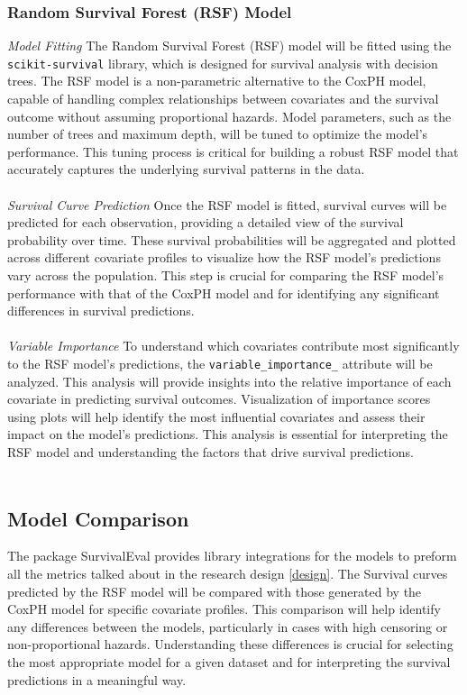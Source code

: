 \subsubsection*{Random Survival Forest (RSF) Model}
\noindent \textit{Model Fitting} The Random Survival Forest (RSF) model will be fitted using the \texttt{scikit-survival} library, which is designed for survival analysis with decision trees. The RSF model is a non-parametric alternative to the CoxPH model, capable of handling complex relationships between covariates and the survival outcome without assuming proportional hazards. Model parameters, such as the number of trees and maximum depth, will be tuned to optimize the model's performance. This tuning process is critical for building a robust RSF model that accurately captures the underlying survival patterns in the data.
\\\\
\noindent \textit{Survival Curve Prediction} Once the RSF model is fitted, survival curves will be predicted for each observation, providing a detailed view of the survival probability over time. These survival probabilities will be aggregated and plotted across different covariate profiles to visualize how the RSF model's predictions vary across the population. This step is crucial for comparing the RSF model's performance with that of the CoxPH model and for identifying any significant differences in survival predictions.
\\\\
\noindent \textit{Variable Importance} To understand which covariates contribute most significantly to the RSF model's predictions, the \texttt{variable\_importance\_} attribute will be analyzed. This analysis will provide insights into the relative importance of each covariate in predicting survival outcomes. Visualization of importance scores using plots will help identify the most influential covariates and assess their impact on the model's predictions. This analysis is essential for interpreting the RSF model and understanding the factors that drive survival predictions.
\\\\

\subsection*{Model Comparison}
The package SurvivalEval \parencite{qi_survivaleval_2024} provides library integrations for the models to preform all the metrics talked about in the research design \ref{design}. The Survival curves predicted by the RSF model will be compared with those generated by the CoxPH model for specific covariate profiles. This comparison will help identify any differences between the models, particularly in cases with high censoring or non-proportional hazards. Understanding these differences is crucial for selecting the most appropriate model for a given dataset and for interpreting the survival predictions in a meaningful way.

